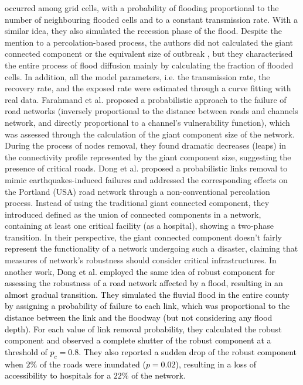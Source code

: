 \documentclass[twocolumn,fleqn,10pt]{wlscirep}
\begin{document}
{\textcolor{black}{occurred}
among grid cells, with a probability of flooding proportional to the number of neighbouring flooded cells and to a constant transmission rate. With a similar idea, they also simulated the recession phase of the flood. 
Despite the mention to a percolation-based process, the authors did not calculated the giant connected component or the equivalent size of outbreak \cite{Newman2018}, but they characterised the entire process of flood diffusion mainly by calculating the fraction of flooded cells. In addition, all the model parameters, i.e. the transmission rate, the recovery rate, and the exposed rate were estimated through a curve fitting with real data.
Farahmand et al. \cite{Farahmand2020} proposed a probabilistic approach to the failure of road networks (inversely proportional to the distance between roads and channels network, and directly proportional to a channel's vulnerability function), which was assessed through the calculation of the giant component size of the network. During the process of nodes removal, they found dramatic decreases (leaps) in the connectivity profile represented by the giant component size, suggesting the presence of critical roads.}
Dong et al. \cite{Dong2019} proposed a probabilistic links removal to mimic earthquakes-induced failures and addressed the corresponding effects on the Portland (USA) road network through a non-conventional percolation process. Instead of using the traditional giant connected component, they introduced  defined as the union of connected components in a network, containing at least one critical facility (as a hospital), showing a two-phase transition. In their perspective, the giant connected component doesn't fairly represent the functionality of a network undergoing such a disaster, claiming that measures of network’s robustness should consider critical infrastructures.
In another work, 
\textcolor{black}{
Dong et al. \cite{Dong2020a} employed the same idea of robust component for assessing the robustness of a road network affected by a flood, resulting in an almost gradual transition.}
\textcolor{black}{
They simulated the fluvial flood in the entire county by assigning a probability of failure to each link, which was proportional to the distance between the link and the floodway (but not considering any flood depth). For each value of link removal probability, they calculated the robust component and observed a complete shutter of the robust component at a threshold of $p_c=0.8$. They also reported a sudden drop of the robust component when $2\%$ of the roads were inundated ($p=0.02$), resulting in a loss of accessibility to hospitals for a $22\%$ of the network.}
\end{document}
